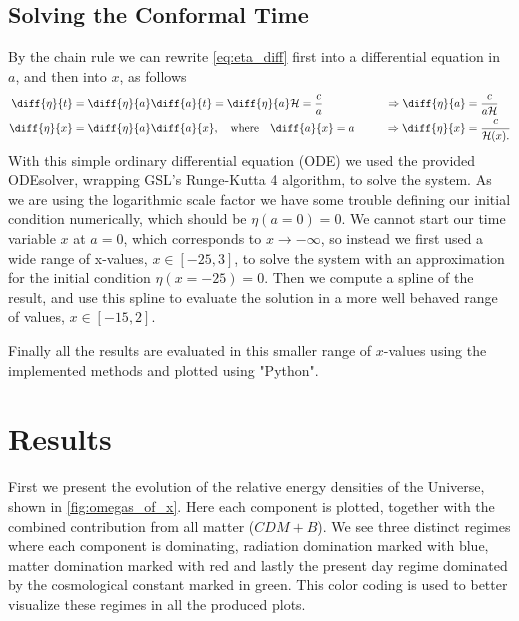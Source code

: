 \documentclass[10pt,a4paper]{article}
\providecommand{\qwhere}
{
    \ensuremath{
    ,\quad \text{where} \quad 
    }
}
\begin{document}
\subsection{Solving the Conformal Time}
\label{subsec:Method/Conformal time}
By the chain rule we can rewrite \cref{eq:eta_diff} first into a differential equation in $a$, and then into $x$, as follows
\begin{alignat}{2}
    \diff{\eta}{t} &= \diff{\eta }{a}\diff{a}{t} = \diff{\eta }{a}\mathcal{H} = \frac{c}{a} & \qquad \Rightarrow \diff{\eta }{a} &= \frac{c}{a\mathcal{H}} \notag
    \\
    \diff{\eta }{x} &= \diff{\eta }{a}\diff{a}{x} \qwhere \diff{a}{x} = a & \qquad \Rightarrow \diff{\eta }{x} &= \frac{c}{\mathcal{H}(x).} \label{eq:eta_diff_of_x}
\end{alignat}
With this simple ordinary differential equation (ODE) we used the provided ODEsolver, wrapping GSL's Runge-Kutta 4 algorithm, to solve the system. As we are using the logarithmic scale factor we have some trouble defining our initial condition numerically, which should be $\eta(a=0)=0$. We cannot start our time variable $x$ at $a=0$, which corresponds to $x\to-\infty$, so instead we first used a wide range of x-values, $x\in[-25,3]$, to solve the system with an approximation for the initial condition $\eta(x=-25)=0$. Then we compute a spline of the result, and use this spline to evaluate the solution in a more well behaved range of values, $x\in[-15,2]$.

Finally all the results are evaluated in this smaller range of $x$-values using the implemented methods and plotted using "Python".

\section{Results}
\label{sec:Results}
First we present the evolution of the relative energy densities of the Universe, shown in \cref{fig:omegas_of_x}. Here each component is plotted, together with the combined contribution from all matter ($CDM + B$). We see three distinct regimes where each component is dominating, radiation domination marked with blue, matter domination marked with red and lastly the present day regime dominated by the cosmological constant marked in green. This color coding is used to better visualize these regimes in all the produced plots.
\end{document}
